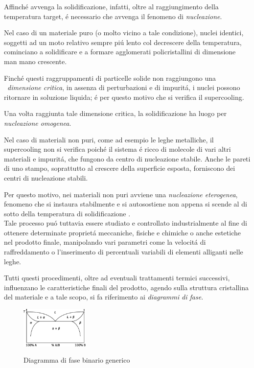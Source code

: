 \documentclass{article}
\begin{document}
        Affinché avvenga la solidificazione, infatti, oltre al raggiungimento della temperatura target,
        é necessario che avvenga il fenomeno di \textit{nucleazione}. 

        Nel caso di un materiale puro (o molto vicino a tale condizione), nuclei identici, soggetti 
        ad un moto relativo sempre piú lento col decrescere della temperatura,
        cominciano a solidificare e a formare agglomerati policristallini di dimensione man mano crescente.

        Finché questi raggruppamenti di particelle solide non raggiungono una \
        \textit{dimensione critica}, in assenza di perturbazioni e di impuritá, i nuclei possono 
        ritornare in soluzione liquida; é per questo motivo che si verifica il supercooling.

        Una volta raggiunta tale dimensione critica, la solidificazione ha luogo per 
        \textit{nucleazione omogenea}.  

        Nel caso di materiali non puri, come ad esempio le leghe metalliche, il supercooling
        non si verifica poiché il sistema é ricco di molecole di vari altri materiali e impuritá, 
        che fungono da centro di nucleazione stabile. Anche le pareti di uno stampo, soprattutto 
        al crescere della superficie esposta, forniscono dei centri di nucleazione stabili. 

        Per questo motivo, nei materiali non puri avviene una \textit{nucleazione eterogenea}, 
        fenomeno che si instaura stabilmente e si autosostiene non appena si scende al di sotto della temperatura di 
        solidificazione \autocite{Mouritz}. \\ 

        Tale processo puó tuttavia essere studiato e controllato industrialmente al fine di 
        ottenere determinate proprietá meccaniche, fisiche e chimiche o anche estetiche nel prodotto finale, 
        manipolando vari parametri come la velocitá di raffreddamento o l'inserimento di percentuali
        variabili di elementi alliganti nelle leghe. 

        Tutti questi procedimenti, oltre ad eventuali trattamenti termici successivi, influenzano le 
        caratteristiche finali del prodotto, agendo sulla struttura cristallina del materiale e
        a tale scopo, si fa riferimento ai \textit{diagrammi di fase}.

            \begin{figure}[h!]
                \centering
                 \label{fig:diagramma_fase}
                \includegraphics[width=0.3\textwidth]{diagramma_fase.eps}
                \caption{Diagramma di fase binario generico \autocite{phase_diagram_generic}}
            \end{figure}
        
\end{document}

